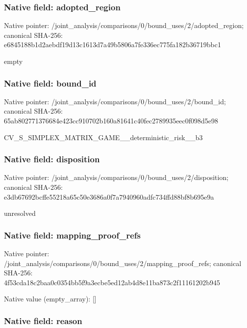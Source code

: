 \documentclass[10pt,a4paper]{article}
\begin{document}
\subsubsection{Native field: adopted\_region}


Native pointer: /joint\_analysis/comparis\allowbreak{}ons/0/bound\_uses/2/adopt\allowbreak{}ed\_region; canonical SHA-256: e6845188b1d2aebdf19d13c1\allowbreak{}613d7a49b5806a7fe336ec77\allowbreak{}5fa182b36719bbc1


empty


\subsubsection{Native field: bound\_id}


Native pointer: /joint\_analysis/comparis\allowbreak{}ons/0/bound\_uses/2/bound\allowbreak{}\_id; canonical SHA-256: 65ab802771376684e423cc91\allowbreak{}0702b160a81641c40fec2789\allowbreak{}935eec0f098d5e98


CV\_S\_SIMPLEX\_MATRIX\_GAME\allowbreak{}\_\_deterministic\_risk\_\_b3


\subsubsection{Native field: disposition}


Native pointer: /joint\_analysis/comparis\allowbreak{}ons/0/bound\_uses/2/dispo\allowbreak{}sition; canonical SHA-256: e3db67692bcffe55218a65c5\allowbreak{}0e3686a0f7a7940960adfc73\allowbreak{}4ffd88bf8b695e9a


unresolved


\subsubsection{Native field: mapping\_proof\_refs}


Native pointer: /joint\_analysis/comparis\allowbreak{}ons/0/bound\_uses/2/mappi\allowbreak{}ng\_proof\_refs; canonical SHA-256: 4f53cda18c2baa0c0354bb5f\allowbreak{}9a3ecbe5ed12ab4d8e11ba87\allowbreak{}3c2f11161202b945



Native value (empty\_array): []



\subsubsection{Native field: reason}
\end{document}
